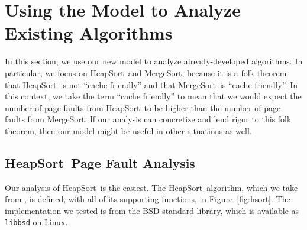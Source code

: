 \documentclass[11pt]{article}
\newcommand{\heapsort}{{\sc HeapSort}}
\newcommand{\mergesort}{{\sc MergeSort}}
\begin{document}
\section{Using the Model to Analyze Existing Algorithms}
\label{analysis}

In this section, we use our new model to analyze already-developed algorithms.
In particular, we focus on \heapsort\ and \mergesort, because it is a folk
theorem that \heapsort\ is not ``cache friendly'' and that \mergesort\ is
``cache friendly''.  In this context, we take the term ``cache friendly'' to
mean that we would expect the number of page faults from \heapsort\ to be
higher than the number of page faults from \mergesort. If our analysis can
concretize and lend rigor to this folk theorem, then our model might be useful
in other situations as well.

\subsection{\heapsort\ Page Fault Analysis} 

Our analysis of \heapsort\ is the easiest.  The \heapsort\ algorithm, which we
take from \cite{clrs}, is defined, with all of its supporting functions, in
Figure~\ref{fig:hsort}.  The implementation we tested is from the BSD standard
library, which is available as {\tt libbsd} on Linux.
\end{document}
